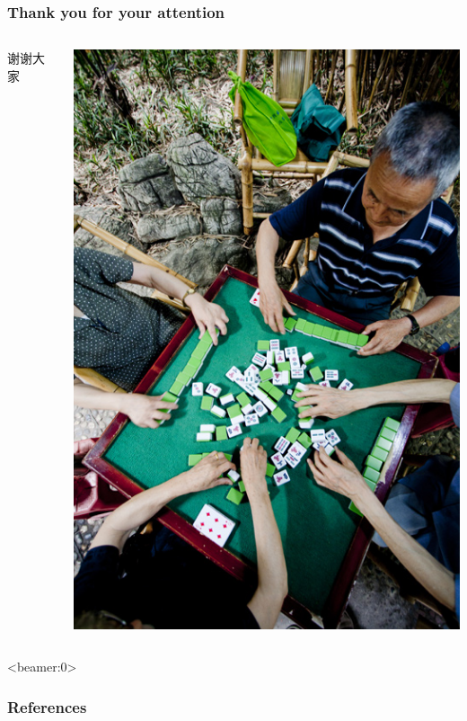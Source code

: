 \documentclass[aspectratio=169]{beamer}
\begin{document}
\begin{frame}
    \frametitle{Thank you for your attention}
    \begin{columns}
    \begin{column}{0.5\textwidth}
        \centering
        \LARGE 谢谢大家
    \end{column}
    \begin{column}{0.5\textwidth}
        \begin{center}
           \includegraphics[scale=0.4]{pics/majiang2.png}     
        \end{center}
    \end{column}
    \end{columns}
\end{frame}

\appendix  %

    \begin{frame}<beamer:0>
        \frametitle{References}
        \def\newblock{}
        
    \end{frame}
\end{document}
